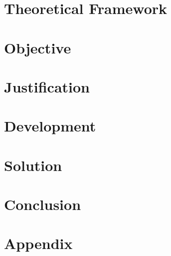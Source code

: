 \documentclass{article}
\begin{document}
\section{Theoretical Framework}

\blindtext

\section{Objective}

\blindtext

\section{Justification}

\blindtext

\section{Development}

\blindtext


\section{Solution}

\blindtext

\section{Conclusion}

\blindtext




\newpage 
    \section{Appendix} 
 
\blindtext
\end{document}
